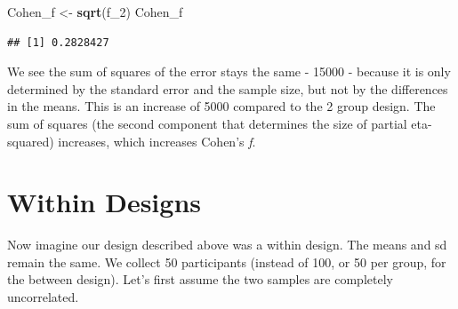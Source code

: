 \documentclass[
]{book}
\newenvironment{Shaded}{\begin{snugshade}}{\end{snugshade}}
\newcommand{\CommentTok}[1]{\textcolor[rgb]{0.56,0.35,0.01}{\textit{#1}}}
\newcommand{\DataTypeTok}[1]{\textcolor[rgb]{0.13,0.29,0.53}{#1}}
\newcommand{\DecValTok}[1]{\textcolor[rgb]{0.00,0.00,0.81}{#1}}
\newcommand{\KeywordTok}[1]{\textcolor[rgb]{0.13,0.29,0.53}{\textbf{#1}}}
\newcommand{\NormalTok}[1]{#1}
\newcommand{\OperatorTok}[1]{\textcolor[rgb]{0.81,0.36,0.00}{\textbf{#1}}}
\newcommand{\StringTok}[1]{\textcolor[rgb]{0.31,0.60,0.02}{#1}}
\begin{document}
\begin{Shaded}
\begin{Highlighting}[]
\NormalTok{Cohen_f <-}\StringTok{ }\KeywordTok{sqrt}\NormalTok{(f_}\DecValTok{2}\NormalTok{)}
\NormalTok{Cohen_f}
\end{Highlighting}
\end{Shaded}

\begin{verbatim}
## [1] 0.2828427
\end{verbatim}

We see the sum of squares of the error stays the same - 15000 - because it is only determined by the standard error and the sample size, but not by the differences in the means. This is an increase of 5000 compared to the 2 group design. The sum of squares (the second component that determines the size of partial eta-squared) increases, which increases Cohen's \emph{f}.

\hypertarget{within-designs}{%
\section{Within Designs}\label{within-designs}}

Now imagine our design described above was a within design. The means and sd remain the same. We collect 50 participants (instead of 100, or 50 per group, for the between design). Let's first assume the two samples are completely uncorrelated.

\begin{Shaded}
\end{Shaded}
\end{document}
